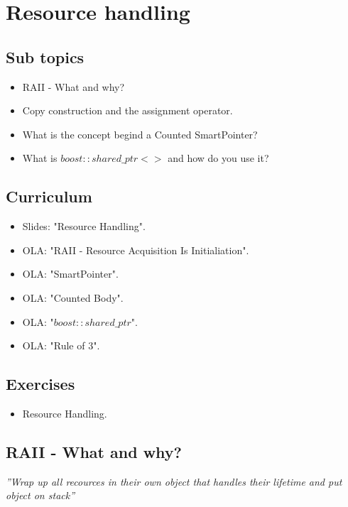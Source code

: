 \section{Resource handling}

\subsection{Sub topics}

\begin{itemize}
	\item RAII - What and why?
	\item Copy construction and the assignment operator.
	\item What is the concept begind a Counted SmartPointer?
	\item What is $boost::shared\_ptr<>$ and how do you use it?
\end{itemize}

\subsection{Curriculum}

\begin{itemize}
	\item Slides: "Resource Handling".
	\item OLA: "RAII - Resource Acquisition Is Initialiation".
	\item OLA: "SmartPointer".
	\item OLA: "Counted Body".
	\item OLA: "$boost::shared\_ptr$".
	\item OLA: "Rule of 3".
\end{itemize}

\subsection{Exercises}

\begin{itemize}
	\item Resource Handling.
\end{itemize}

\subsection{RAII - What and why?}\label{sec:raii}
\textit{''Wrap up all recources in their own object that handles their lifetime and put object on stack''}\\

